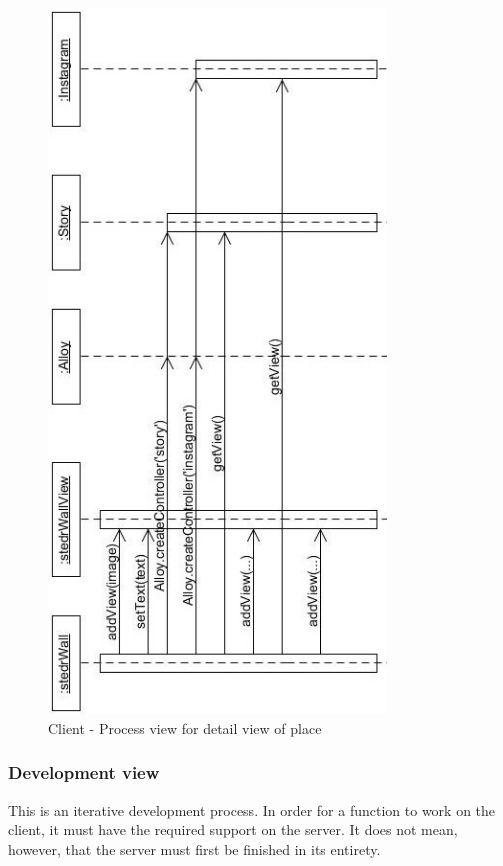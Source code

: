\documentclass[11pt]{book}
\begin{document}
\begin{figure}[H]
      \centering
      \includegraphics[width=0.8\textwidth]{Figures/Architecture/Sequence/client/stedrWall.jpg}
      \caption{Client - Process view for detail view of place}
      \label{fig:arch_client_process}
\end{figure}



\subsubsection{Development view}
This is an iterative development process. In order for a function to work on the client, it must have the required support on the server. It does not mean, however, that the server must first be finished in its entirety.
\end{document}
